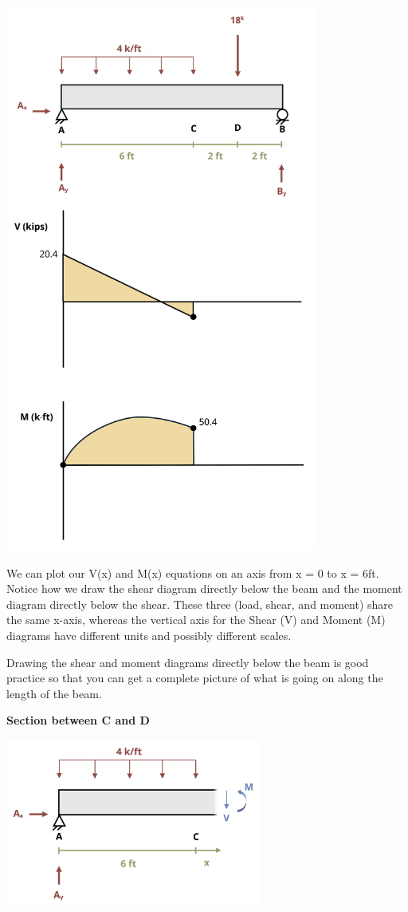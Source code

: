\documentclass[
  letterpaper,
  DIV=11,
  numbers=noendperiod]{scrreprt}
\begin{document}
\begin{tcolorbox}
\begin{center}
\includegraphics[width=4.05208in,height=\textheight]{images/CH7 PNGs/example 7.2 part 5.png}
\end{center}

We can plot our V(x) and M(x) equations on an axis from x = 0 to x =
6ft. Notice how we draw the shear diagram directly below the beam and
the moment diagram directly below the shear. These three (load, shear,
and moment) share the same x-axis, whereas the vertical axis for the
Shear (V) and Moment (M) diagrams have different units and possibly
different scales.

Drawing the shear and moment diagrams directly below the beam is good
practice so that you can get a complete picture of what is going on
along the length of the beam.

\textbf{Section between C and D}

\begin{center}
\includegraphics[width=3.3125in,height=\textheight]{images/CH7 PNGs/example 7.2 part 6.png}
\end{center}


\end{tcolorbox}
\end{document}
